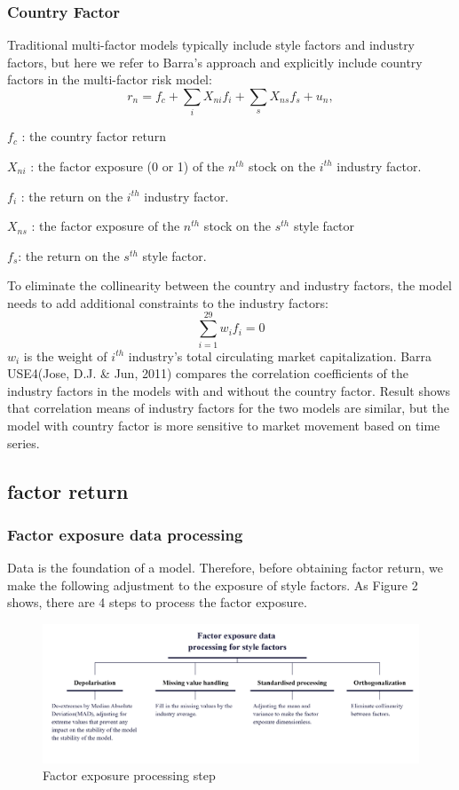 \documentclass[10pt]{article}
\begin{document}
\subsubsection{Country Factor}
Traditional multi-factor models typically include style factors and industry factors, but here we refer to Barra's approach and explicitly include country factors in the multi-factor risk model:
\begin{equation}
    r_n=f_c+\sum_{i} X_{ni}f_i+\sum_{s}X_{ns} f_s+u_n,
\end{equation}
\centerline{$f_c$ : the country factor return}
\centerline{$X_{ni}$ : the factor exposure (0 or 1) of the $n^{th}$ stock on the $i^{th}$ industry factor.}
\centerline{$f_{i}$ : the return on the $i^{th}$ industry factor. }
\centerline{$X_{ns}$ : the factor exposure of the $n^{th}$ stock on the $s^{th}$ style factor}
\centerline{ $f_s$: the return on the $s^{th}$ style factor.}

To eliminate the collinearity between the country and industry factors, the model needs to add additional constraints to the industry factors:
\begin{equation}
    \sum^{29}_{i=1}w_i f_i=0
\end{equation}
$w_i$ is the weight of $i^{th}$ industry's total circulating market capitalization. 
Barra USE4(Jose, D.J. \& Jun, 2011) compares the correlation coefficients of the industry factors in the models with and without the country factor. Result shows that correlation means of industry factors for the two models are similar, but the model with country factor is more sensitive to market movement based on time series.

\subsection{factor return}
\subsubsection{Factor exposure data processing}
Data is the foundation of a model. Therefore, before obtaining factor return, we make the following adjustment to the exposure of style factors. As Figure 2 shows, there are 4 steps to process the factor exposure.
\begin{figure}[H]
    \centering
     \includegraphics[width=1\textwidth]{exposure.png}
    \caption{Factor exposure processing step}
    \label{fig:Fig2}
\end{figure}
\end{document}
